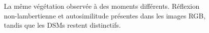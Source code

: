 \begin{figure}[htbp]
\begin{center}
{\begin{minipage}[t]{0.45\linewidth}
			\end{minipage}%
		}
		\caption{La même végétation observée à des moments différents. Réflexion non-lambertienne et autosimilitude présentes dans les images RGB, tandis que les \ac{DSM}s restent distinctifs.}
		\label{Pauvrementtexture}
	\end{center}
\end{figure} 

